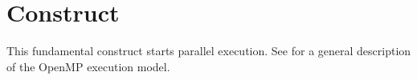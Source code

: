 %
%
%
%
%
%
%
%
%
%
%
%
%


\section{ Construct}
\label{sec:parallel Construct}
\summary
This fundamental construct starts parallel execution. See
for a general description of the OpenMP execution model.

